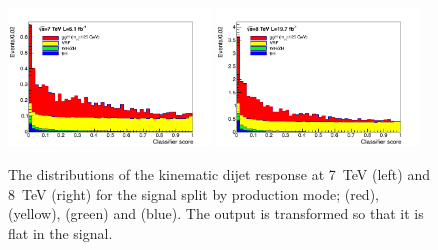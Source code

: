 \begin{figure}
  \includegraphics[width=0.48\textwidth]{selec_and_cats/plots/dijetbdt_transformed_signal_7TeV_fix_fix.pdf}
  \includegraphics[width=0.48\textwidth]{selec_and_cats/plots/dijetbdt_transformed_signal_8TeV_fix_fix.pdf} 
  \caption[The kinematic dijet \acs{BDT} response]{The distributions of the kinematic dijet \BDT response at 7~TeV (left) and 8~TeV (right) for the signal split by production mode; \ggH (red), \VBF (yellow), \VH (green) and \ttH (blue). The output is transformed so that it is flat in the \VBF signal.}
  \label{fig:vbf_dijet_kin}
\end{figure}

